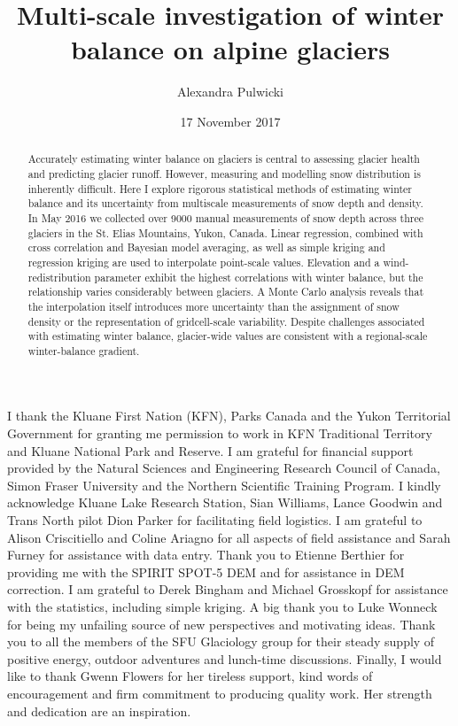 \documentclass{sfuthesis}
\title{Multi-scale investigation of winter balance on alpine glaciers}
\author{Alexandra Pulwicki}
\date{17 November 2017}
\begin{document}
\frontmatter
\maketitle{}
\makecommittee{}

\begin{abstract}
	Accurately estimating winter balance on glaciers is central to assessing glacier health and predicting glacier runoff. However, measuring and modelling snow distribution is inherently difficult. Here I explore rigorous statistical methods of estimating winter balance and its uncertainty from multiscale measurements of snow depth and density. In May 2016 we collected over 9000 manual measurements of snow depth across three glaciers in the St. Elias Mountains, Yukon, Canada. Linear regression, combined with cross correlation and Bayesian model averaging, as well as simple kriging and regression kriging are used to interpolate point-scale values. Elevation and a wind-redistribution parameter exhibit the highest correlations with winter balance, but the relationship varies considerably between glaciers. A Monte Carlo analysis reveals that the interpolation itself introduces more uncertainty than the assignment of snow density or the representation of gridcell-scale variability. Despite challenges associated with estimating winter balance,  glacier-wide values are consistent with a regional-scale winter-balance gradient.
\end{abstract}




\begin{acknowledgements}
I thank the Kluane First Nation (KFN), Parks Canada and the Yukon Territorial Government for granting me permission to work in KFN Traditional Territory and Kluane National Park and Reserve. I am grateful for financial support provided by the Natural Sciences and Engineering Research Council of  Canada, Simon Fraser University and the Northern Scientific  Training Program. I kindly acknowledge Kluane Lake Research Station, Sian Williams, Lance Goodwin and Trans North pilot Dion Parker for facilitating field logistics. I am grateful to Alison Criscitiello and Coline Ariagno for all aspects of field assistance and Sarah Furney for assistance with data entry. Thank you to Etienne Berthier for providing me with the SPIRIT SPOT-5 DEM and for assistance in DEM correction. I am grateful to Derek Bingham and Michael Grosskopf for assistance with the statistics, including simple kriging. A big thank you to Luke Wonneck for being my unfailing source of new perspectives and motivating ideas. Thank you to all the members of the SFU Glaciology group for their steady supply of positive energy, outdoor adventures and lunch-time discussions. Finally, I would like to thank Gwenn Flowers for her tireless support, kind words of encouragement and firm commitment to producing quality work. Her strength and dedication are an inspiration. 
\end{acknowledgements}
\end{document}
